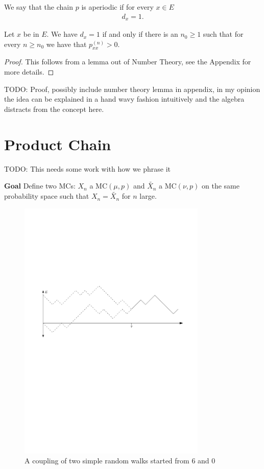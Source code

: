 \begin{defn}
	We say that the chain $p$ is aperiodic if for every $x \in E$
	\begin{align}
	\boxed{d_x=1}.
	\end{align}
\end{defn}

\begin{prop}[]
	Let $x$ be in $E$. We have $d_x=1$ if and only if there is an $n_0 \geq 1$ such that for every $n \geq n_0$ we have that $ p_{xx}^{(n)}>0$.
\end{prop}
\begin{proof}
	This follows from a lemma out of Number Theory, see the Appendix for more details.
\end{proof}

TODO: Proof, possibly include number theory lemma in appendix, in my opinion the idea can be explained in a hand wavy fashion intuitively and the algebra distracts from the concept here.

\section{Product Chain}
TODO: This needs some work with how we phrase it

\textbf{Goal} Define two MCs: $X_n$ a MC$(\mu, p)$ and $\tilde{X_n}$ a MC$(\nu, p) $ on the same probability space such that $X_n = \tilde{X_n}$ for $n$ large.

\begin{figure}[h!]
	\centering
	\includegraphics[width=0.8\textwidth]{figures/coupling.pdf}
	\caption{A coupling of two simple random walks started from $6$ and $0$}
\end{figure}


